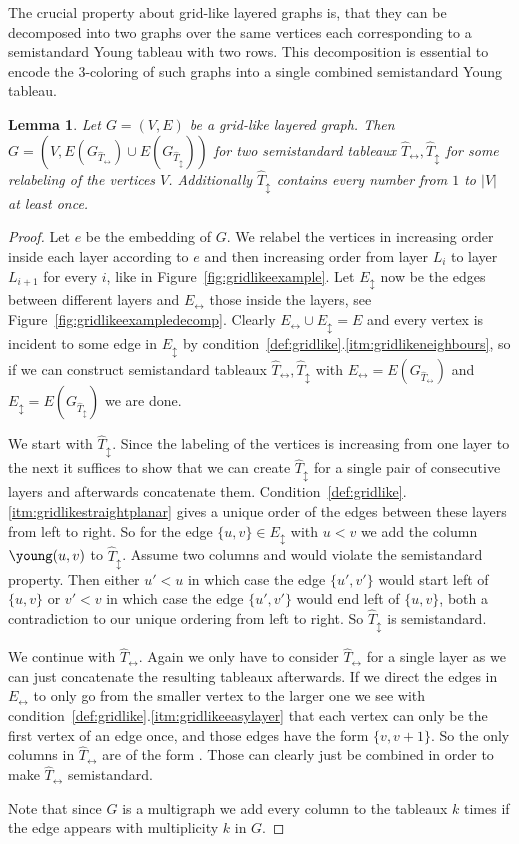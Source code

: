 \documentclass[10pt,a4paper]{article}
\numberwithin{equation}{section}
\newtheorem{lemma}[equation]{Lemma}
\theoremstyle{definition}
\newcommand{\Thor}{{\ensuremath{\hat{T}_{\leftrightarrow}}}}
\newcommand{\Tvert}{{\ensuremath{\hat{T}_{\updownarrow}}}}
\newcommand{\Ehor}{{\ensuremath{E_{\leftrightarrow}}}}
\newcommand{\Evert}{{\ensuremath{E_{\updownarrow}}}}
\begin{document}
The crucial property about grid-like layered graphs is, that they can be decomposed into two graphs over the same vertices each corresponding to a semistandard Young tableau with two rows.
This decomposition is essential to encode the $3$-coloring of such graphs into a single combined semistandard Young tableau.
\begin{lemma}
    \label{lem:gridlikedecomp}
    Let $G = (V, E)$ be a grid-like layered graph.
    Then $G = (V, E(G_{\Thor}) \cup E(G_{\Tvert}))$ for two semistandard tableaux $\Thor, \Tvert$ for some relabeling of the vertices $V$.
    Additionally $\Tvert$ contains every number from $1$ to $|V|$ at least once.
\end{lemma}
\begin{proof}
    Let $e$ be the embedding of $G$.
    We relabel the vertices in increasing order inside each layer according to $e$ and then increasing order from layer $L_i$ to layer $L_{i+1}$ for every $i$, like in Figure~\ref{fig:gridlikeexample}.
    Let $\Evert$ now be the edges between different layers and $\Ehor$ those inside the layers, see Figure~\ref{fig:gridlikeexampledecomp}.
    Clearly $\Ehor \cup \Evert = E$ and every vertex is incident to some edge in $\Evert$ by condition~\ref{def:gridlike}.\ref{itm:gridlikeneighbours}, so if we can construct semistandard tableaux $\Thor, \Tvert$ with $\Ehor = E(G_{\Thor})$ and $\Evert = E(G_{\Tvert})$ we are done.

    We start with $\Tvert$.
    Since the labeling of the vertices is increasing from one layer to the next it suffices to show that we can create $\Tvert$ for a single pair of consecutive layers and afterwards concatenate them.
    Condition~\ref{def:gridlike}.\ref{itm:gridlikestraightplanar} gives a unique order of the edges between these layers from left to right.
    So for the edge $\{u, v\} \in \Evert$ with $u < v$ we add the column {\scriptsize $\young(u,v)$} to $\Tvert$.
    Assume two columns
    {\scriptsize
{}}
    and
    {\scriptsize
{}}
would violate the semistandard property.
    Then either $u' < u$ in which case the edge $\{u', v'\}$ would start left of $\{u, v\}$ or $v' < v$ in which case the edge $\{u', v'\}$ would end left of $\{u, v\}$, both a contradiction to our unique ordering from left to right.
    So $\Tvert$ is semistandard.

    We continue with $\Thor$.
    Again we only have to consider $\Thor$ for a single layer as we can just concatenate the resulting tableaux afterwards.
    If we direct the edges in $\Ehor$ to only go from the smaller vertex to the larger one we see with condition~\ref{def:gridlike}.\ref{itm:gridlikeeasylayer} that each vertex can only be the first vertex of an edge once, and those edges have the form $\{v, v+1\}$.
    So the only columns in $\Thor$ are of the form
{\scriptsize
{}}.
    Those can clearly just be combined in order to make $\Thor$ semistandard.

    Note that since $G$ is a multigraph we add every column to the tableaux $k$ times if the edge appears with multiplicity $k$ in $G$.
\end{proof}
\end{document}
